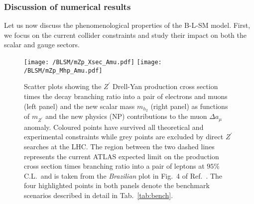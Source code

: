 

\subsubsection{Discussion of numerical results}
\label{sec:discuss}


Let us now discuss the phenomenological properties of the B-L-SM model. First, we focus on the current collider constraints and study their impact on both the scalar and gauge sectors.
\begin{figure}[H]
	\centering
	\texttt{[image: /BLSM/mZp\_Xsec\_Amu.pdf]}
	\texttt{[image: /BLSM/mZp\_Mhp\_Amu.pdf]}
	\caption{Scatter plots showing the $Z^\prime$ Drell-Yan production cross section times the decay branching ratio into a pair of electrons and muons (left panel) and the new scalar mass $m_{h_2}$ (right panel) as functions of $m_{Z^\prime}$ and the new physics (NP) contributions to the muon $\Delta a_\mu$ anomaly. Coloured points have survived all theoretical and experimental constraints while grey points are excluded by direct $Z^\prime$ searches at the LHC. The region between the two dashed lines represents the current ATLAS expected limit on the production cross section times branching ratio into a pair of leptons at $95\%$ C.L.~and is taken from the \textit{Brazilian} plot in Fig.~4 of Ref.~\cite{Aaboud:2017buh}. The four highlighted points in both panels denote the benchmark scenarios described in detail in Tab.~\ref{tab:bench}.}
	\label{fig:Plots1}
\end{figure}	

